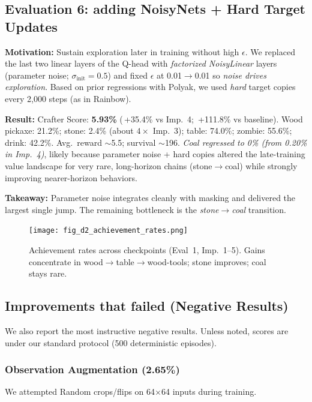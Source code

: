 \documentclass[conference]{IEEEtran}
\begin{document}
\subsection{Evaluation 6: adding NoisyNets + Hard Target Updates}
\textbf{Motivation:} Sustain exploration later in training without high $\epsilon$. We replaced the last two linear layers of the Q-head with \emph{factorized NoisyLinear} layers (parameter noise; $\sigma_{\text{init}}{=}0.5$) and fixed $\epsilon$ at 0.01$\!\rightarrow$0.01 so \emph{noise drives exploration}. Based on prior regressions with Polyak, we used \emph{hard} target copies every 2{,}000 steps (as in Rainbow).

\textbf{Result:} Crafter Score: \textbf{5.93\%} (\,+35.4\% vs Imp.~4; \,+111.8\% vs baseline). Wood pickaxe: 21.2\%; stone: 2.4\% (about $4\times$ Imp.~3); table: 74.0\%; zombie: 55.6\%; drink: 42.2\%. Avg.\ reward $\sim$5.5; survival $\sim$196. \emph{Coal regressed to 0\% (from 0.20\% in Imp.~4)}, likely because parameter noise + hard copies altered the late-training value landscape for very rare, long-horizon chains (stone$\rightarrow$coal) while strongly improving nearer-horizon behaviors.

\textbf{Takeaway:} Parameter noise integrates cleanly with masking and delivered the largest single jump. The remaining bottleneck is the \emph{stone$\rightarrow$coal} transition.

\begin{figure}[h!]
\centering
\texttt{[image: fig\_d2\_achievement\_rates.png]}
\caption{Achievement rates across checkpoints (Eval~1, Imp.~1–5). Gains concentrate in wood$\rightarrow$table$\rightarrow$wood-tools; stone improves; coal stays rare.}
\label{fig:dqn_achievements}
\end{figure}

\subsection{Improvements that failed (Negative Results)}
We also report the most instructive negative results. Unless noted, scores are under our standard protocol (500 deterministic episodes).

\subsubsection{Observation Augmentation (2.65\%)}

We attempted Random crops/flips on 64$\times$64 inputs during training.
\end{document}
